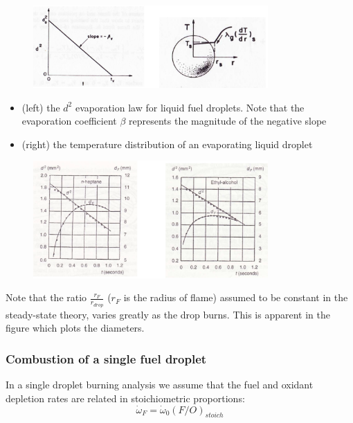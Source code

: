 \documentclass[12pt]{article}
\begin{document}
\begin{figure}[h!]
\centering
\includegraphics[width=0.8\textwidth]{figures/droprate.png}
\end{figure}

\begin{itemize}
    \item (left) the $d^{2}$ evaporation law for liquid fuel droplets. Note that the evaporation coefficient $\beta$ represents the magnitude of the negative slope
    \item (right) the temperature distribution of an evaporating liquid droplet
\end{itemize}

\begin{figure}[h!]
\centering
\includegraphics[width=0.8\textwidth]{figures/flamediameter.png}
\end{figure}

Note that the ratio $\frac{r_{F}}{r_{drop}}$ ($r_{F}$ is the radius of flame) assumed to be constant in the steady-state theory, varies greatly as the drop burns. This is apparent in the figure which plots the diameters.

\subsubsection{Combustion of a single fuel droplet}

In a single droplet burning analysis we assume that the fuel and oxidant depletion rates are related in stoichiometric proportions:
\begin{equation}
    \dot{\omega}_{F} = \dot{\omega}_{0}(F/O)_{stoich}
\end{equation}
\end{document}

